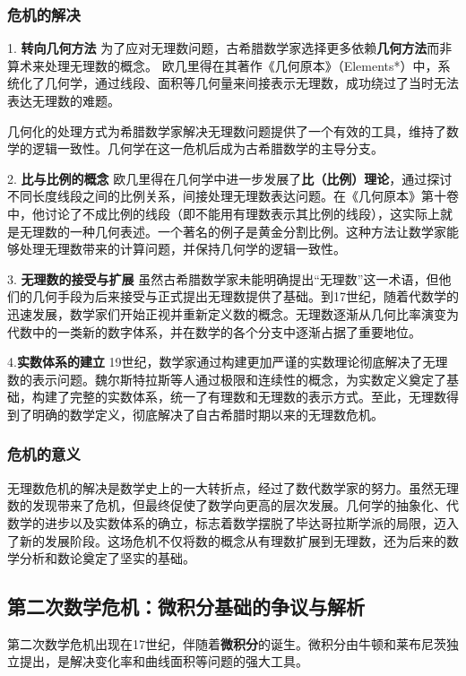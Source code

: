 \subsubsection{危机的解决}
1. {\bf 转向几何方法}
为了应对无理数问题，古希腊数学家选择更多依赖{\bf 几何方法}而非算术来处理无理数的概念。
欧几里得在其著作《几何原本》（Elements*）中，系统化了几何学，通过线段、面积等几何量来间接表示无理数，成功绕过了当时无法表达无理数的难题。

几何化的处理方式为希腊数学家解决无理数问题提供了一个有效的工具，维持了数学的逻辑一致性。几何学在这一危机后成为古希腊数学的主导分支。

2. {\bf 比与比例的概念}
欧几里得在几何学中进一步发展了{\bf 比（比例）理论}，通过探讨不同长度线段之间的比例关系，间接处理无理数表达问题。在《几何原本》第十卷中，他讨论了不成比例的线段（即不能用有理数表示其比例的线段），这实际上就是无理数的一种几何表述。一个著名的例子是黄金分割比例。这种方法让数学家能够处理无理数带来的计算问题，并保持几何学的逻辑一致性。

3. {\bf 无理数的接受与扩展}
虽然古希腊数学家未能明确提出“无理数”这一术语，但他们的几何手段为后来接受与正式提出无理数提供了基础。到17世纪，随着代数学的迅速发展，数学家们开始正视并重新定义数的概念。无理数逐渐从几何比率演变为代数中的一类新的数字体系，并在数学的各个分支中逐渐占据了重要地位。

4.{\bf 实数体系的建立}
19世纪，数学家通过构建更加严谨的实数理论彻底解决了无理数的表示问题。魏尔斯特拉斯等人通过极限和连续性的概念，为实数定义奠定了基础，构建了完整的实数体系，统一了有理数和无理数的表示方式。至此，无理数得到了明确的数学定义，彻底解决了自古希腊时期以来的无理数危机。

\subsubsection{危机的意义}
无理数危机的解决是数学史上的一大转折点，经过了数代数学家的努力。虽然无理数的发现带来了危机，但最终促使了数学向更高的层次发展。几何学的抽象化、代数学的进步以及实数体系的确立，标志着数学摆脱了毕达哥拉斯学派的局限，迈入了新的发展阶段。这场危机不仅将数的概念从有理数扩展到无理数，还为后来的数学分析和数论奠定了坚实的基础。

\subsection{第二次数学危机：微积分基础的争议与解析}
第二次数学危机出现在17世纪，伴随着{\bf 微积分}的诞生。微积分由牛顿和莱布尼茨独立提出，是解决变化率和曲线面积等问题的强大工具。

